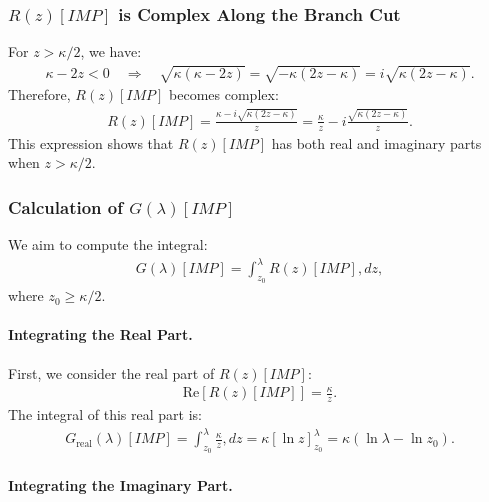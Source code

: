 \subsubsection{$R(z)[IMP]$ is Complex Along the Branch Cut}

For $z > \kappa/2$, we have:
\begin{align}
\kappa - 2z < 0 \quad \Rightarrow \quad \sqrt{\kappa(\kappa - 2z)} = \sqrt{-\kappa(2z - \kappa)} = i \sqrt{\kappa(2z - \kappa)}.
\end{align}
%
Therefore, $R(z)[IMP]$ becomes complex:
\begin{align}
R(z)[IMP] = \frac{\kappa - i \sqrt{\kappa(2z - \kappa)}}{z} = \frac{\kappa}{z} - i \frac{ \sqrt{ \kappa(2z - \kappa) } }{ z }.
\end{align}
%
This expression shows that $R(z)[IMP]$ has both real and imaginary parts when $z > \kappa/2$.

\subsubsection{Calculation of $G(\lambda)[IMP]$}

We aim to compute the integral:
\begin{align}
G(\lambda)[IMP] = \int_{z_0}^\lambda R(z)[IMP] , dz,
\end{align}
where $z_0 \geq \kappa/2$.


\paragraph{Integrating the Real Part.}

First, we consider the real part of $R(z)[IMP]$:
\begin{align}
\text{Re}[R(z)[IMP]] = \frac{\kappa}{z}.
\end{align}
%
The integral of this real part is:
\begin{align}
G_{\text{real}}(\lambda)[IMP] = \int_{z_0}^\lambda \frac{\kappa}{z} , dz = \kappa \left[ \ln z \right]_{z_0}^\lambda = \kappa \left( \ln \lambda - \ln z_0 \right).
\end{align}


\paragraph{Integrating the Imaginary Part.}

